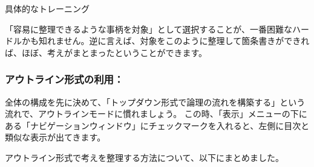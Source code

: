 \documentclass[12pt,a4paper]{jsarticle}
\makeatletter
\def\subsection{\@startsection 
{subsection}
{1}
{\z@}
{3.5ex plus -1ex minus -.2ex}
{1.ex plus .2ex}
{\large\bf}
}
\makeatother
\begin{document}
\subsection{具体的なトレーニング}

「容易に整理できるような事柄を対象」として選択することが、一番困難なハードルかも知れません。逆に言えば、対象をこのように整理して箇条書きができれば、ほぼ、考えがまとまったということができます。

\subsubsection{アウトライン形式の利用：}

全体の構成を先に決めて、「トップダウン形式で論理の流れを構築する」という流れで、アウトラインモードに慣れましょう。
この時、「表示」メニューの下にある「ナビゲーションウィンドウ」にチェックマークを入れると、左側に目次と類似な表示が出てきます。

アウトライン形式で考えを整理する方法について、以下にまとめました。
\end{document}
